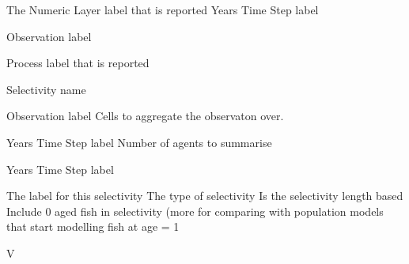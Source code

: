 \par\textbf{}\par
{} {The Numeric Layer label that is reported}
 {Years}
 {Time Step label}
\par\textbf{}\par
{} {Observation label}
\par\textbf{}\par
{} {Process label that is reported}
\par\textbf{}\par
{} {Selectivity name}
\par\textbf{}\par
{} {Observation label}
 {Cells to aggregate the observaton over.}
\par\textbf{}\par
\par\textbf{}\par
{} {Years}
 {Time Step label}
 {Number of agents to summarise}
\par\textbf{}\par
\par\textbf{}\par
{} {Years}
 {Time Step label}
\par\par
{} {The label for this selectivity}
 {The type of selectivity}
 {Is the selectivity length based}
 {Include 0 aged fish in selectivity (more for comparing with population models that start modelling fish at age = 1}
\par\textbf{}\par
{} {V}
\par\textbf{}\par
